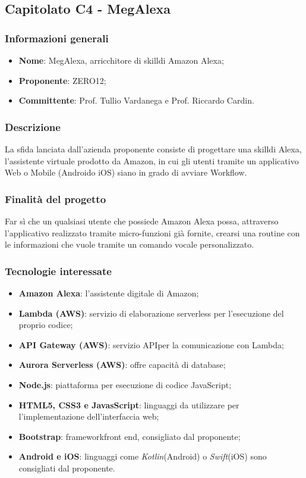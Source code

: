 \subsection{Capitolato C4 - MegAlexa}
\subsubsection{Informazioni generali}
\begin{itemize}
	\item \textbf{Nome}: MegAlexa, arricchitore di skill\glosp di Amazon Alexa;
	\item \textbf{Proponente}: ZERO12;
	\item \textbf{Committente}: Prof. Tullio Vardanega e Prof. Riccardo Cardin.
\end{itemize}
\subsubsection{Descrizione}
La sfida lanciata dall'azienda proponente consiste di progettare una skill\glosp di Alexa, l’assistente virtuale prodotto da Amazon, in cui gli utenti tramite un applicativo Web o Mobile (Android\glosp o iOS) siano in grado di avviare Workflow\glo.
\subsubsection{Finalità del progetto}
Far sì che un qualsiasi utente che possiede Amazon Alexa possa, attraverso l’applicativo realizzato tramite micro-funzioni già fornite, crearsi una routine con le informazioni che vuole tramite un comando vocale personalizzato.
\subsubsection{Tecnologie interessate}
\begin{itemize}
	\item \textbf{Amazon Alexa}: l'assistente digitale di Amazon;
	\item \textbf{Lambda (AWS\glo)}: servizio di elaborazione serverless per l'esecuzione del proprio codice; 
	\item \textbf{API Gateway (AWS)}: servizio API\glosp per la comunicazione con Lambda;
	\item \textbf{Aurora Serverless (AWS)}: offre capacità di database;
	\item \textbf{Node.js\glo}: piattaforma per esecuzione di codice JavaScript;
	\item \textbf{HTML5, CSS3 e JavasScript}: linguaggi da utilizzare per l'implementazione dell'interfaccia web;
	\item \textbf{Bootstrap\glo}: framework\glosp front end\glo, consigliato dal proponente;
	\item \textbf{Android e iOS}: linguaggi come \textit{Kotlin\glosp}(Android\glo) o \textit{Swift\glosp}(iOS) sono consigliati dal proponente.
\end{itemize}

